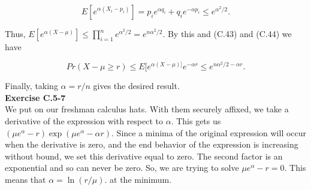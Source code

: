 \documentclass{article}
\begin{document}
\[ E[e^{\alpha(X_i-p_i)}] = p_ie^{\alpha q_i} + q_ie^{-\alpha p_i} \leq e^{\alpha^2/2}.\]

Thus, $E[e^{\alpha(X-\mu)}] \leq \prod_{i=1}^n e^{\alpha^2/2} = e^{n\alpha^2/2}$.  By this and (C.43) and (C.44) we have 

\[Pr(X-\mu \geq r) \leq E[e^{\alpha(X-\mu)]}e^{-\alpha r} \leq e^{n \alpha^2/2 - \alpha r}.\]

Finally, taking $\alpha = r/n$ gives the desired result. \\

\noindent\textbf{Exercise C.5-7}\\

We put on our freshman calculus hats. With them securely affixed, we take a derivative of the expression with respect to $\alpha$. This gets us $(\mu e^{\alpha} - r)\exp(\mu e^{\alpha}- \alpha r)$. Since a minima of the original expression will occur when the derivative is zero, and the end behavior of the expression is increasing without bound, we set this derivative equal to zero. The second factor is an exponential and so can never be zero. So, we are trying to solve $\mu e^{\alpha} - r = 0$. This means that $\alpha = \ln(r/\mu)$. at the minimum.\\
\end{document}
